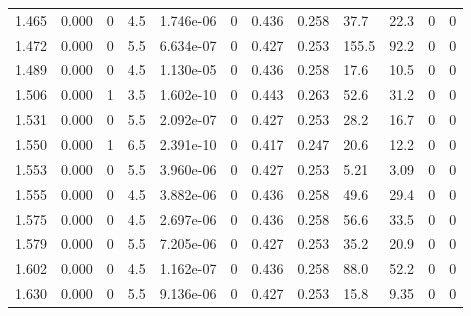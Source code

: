 \documentclass[preview]{standalone}
\begin{document}
{{{\begin{tabular}{L{1.2cm}C{1.2cm} C{0.3cm}C{0.5cm} C{1.4cm}C{1.4cm} C{1.4cm}C{1.4cm} C{1.6cm}C{1.6cm} C{1.6cm}C{1.6cm}}
  1.465  &  0.000  & 0     & 4.5 &  1.746e-06  & 0  &  0.436&   0.258& 37.7 & 22.3   &  0 & 0  \\ 
  1.472  &  0.000  & 0     & 5.5 &  6.634e-07  & 0  &  0.427&   0.253& 155.5 & 92.2   &  0 & 0  \\ 
  1.489  &  0.000  & 0     & 4.5 &  1.130e-05  & 0  &  0.436&   0.258& 17.6 & 10.5   &  0 & 0  \\ 
  1.506  &  0.000  & 1     & 3.5 &  1.602e-10  & 0  &  0.443&   0.263& 52.6 & 31.2   &  0 & 0  \\ 
  1.531  &  0.000  & 0     & 5.5 &  2.092e-07  & 0  &  0.427&   0.253& 28.2 & 16.7   &  0 & 0  \\ 
  1.550  &  0.000  & 1     & 6.5 &  2.391e-10  & 0  &  0.417&   0.247& 20.6 & 12.2   &  0 & 0  \\ 
  1.553  &  0.000  & 0     & 5.5 &  3.960e-06  & 0  &  0.427&   0.253& 5.21 & 3.09   &  0 & 0  \\ 
  1.555  &  0.000  & 0     & 4.5 &  3.882e-06  & 0  &  0.436&   0.258& 49.6 & 29.4   &  0 & 0  \\ 
  1.575  &  0.000  & 0     & 4.5 &  2.697e-06  & 0  &  0.436&   0.258& 56.6 & 33.5   &  0 & 0  \\ 
  1.579  &  0.000  & 0     & 5.5 &  7.205e-06  & 0  &  0.427&   0.253& 35.2 & 20.9   &  0 & 0  \\ 
  1.602  &  0.000  & 0     & 4.5 &  1.162e-07  & 0  &  0.436&   0.258& 88.0 & 52.2   &  0 & 0  \\ 
  1.630  &  0.000  & 0     & 5.5 &  9.136e-06  & 0  &  0.427&   0.253& 15.8 & 9.35   &  0 & 0  \\ 
\hline 
\end{tabular} 

}}}
\end{document}
